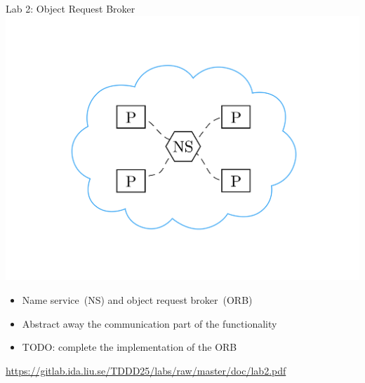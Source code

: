 \documentclass[compress,xcolor=table]{beamer}
\begin{document}
\begin{frame}{Lab 2: Object Request Broker}
  \centering
  \includegraphics[scale=0.10,page=1]{include/assets/name-service}
  \begin{itemize}
    \item Name service~(NS) and object request broker~(ORB)
    \item Abstract away the communication part of the functionality
    \item \alert{TODO}: complete the implementation of the ORB
  \end{itemize}
  \begin{center}
    \scriptsize \url{https://gitlab.ida.liu.se/TDDD25/labs/raw/master/doc/lab2.pdf}
  \end{center}
\end{frame}
\end{document}

